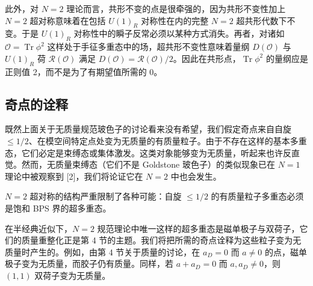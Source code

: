 \documentclass[11pt,a4paper,UTF8,fontset=fandol]{ctexart}
\theoremstyle{plain}
\theoremstyle{definition}
\newcommand{\Tr}{\operatorname{Tr}}
\newcommand{\Nc}{\mathcal{N}}
\newcommand{\Oo}{\mathcal{O}}
\def\Nc{N}%
\begin{document}
此外，对 $\Nc=2$ 理论而言，共形不变的点是很牵强的，因为共形不变性加上 $\Nc=2$ 超对称意味着在包括 $U(1)_R$ 对称性在内的完整 $\Nc=2$ 超共形代数下不变。于是 $U(1)_R$ 对称性中的瞬子反常必须以某种方式消失。再者，对诸如 $\Oo=\Tr\phi^2$ 这样处于手征多重态中的场，超共形不变性意味着量纲 $D(\Oo)$ 与 $U(1)_R$ 荷 $\mathcal R(\Oo)$ 满足 $D(\Oo)=\mathcal R(\Oo)/2$。因此在共形点，$\Tr\phi^2$ 的量纲应是正则值 2，而不是为了有期望值所需的 0。

\subsection{奇点的诠释}

既然上面关于无质量规范玻色子的讨论看来没有希望，我们假定奇点来自自旋 $\le1/2$、在模空间特定点处变为无质量的有质量粒子。由于不存在这样的基本多重态，它们必定是束缚态或集体激发。这类对象能够变为无质量，听起来也许反直觉。然而，无质量束缚态（它们不是 Goldstone 玻色子）的类似现象已在 $\Nc=1$ 理论中被观察到 [2]，我们将论证它在 $\Nc=2$ 中也会发生。

$\Nc=2$ 超对称的结构严重限制了各种可能：自旋 $\le1/2$ 的有质量粒子多重态必须是饱和 BPS 界的超多重态。

在半经典近似下，$\Nc=2$ 规范理论中唯一这样的超多重态是磁单极子与双荷子，它们的质量重整化正是第 4 节的主题。我们将把所需的奇点诠释为这些粒子变为无质量时产生的。例如，由第 4 节关于质量的讨论，在 $a_D=0$ 而 $a\ne0$ 的点，磁单极子变为无质量，而胶子仍有质量。同样，若 $a+a_D=0$ 而 $a,a_D\ne0$，则 $(1,1)$ 双荷子变为无质量。
\end{document}
